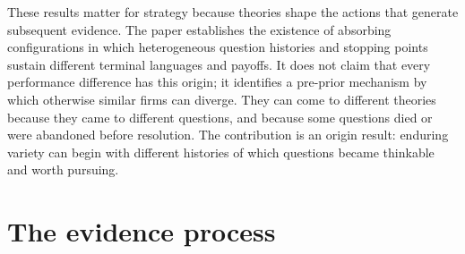 \documentclass[11pt]{article}
\theoremstyle{definition}
\begin{document}
These results matter for strategy because theories shape the actions that generate subsequent evidence.
The paper establishes the existence of absorbing configurations in which heterogeneous question histories and stopping points sustain different terminal languages and payoffs.
It does not claim that every performance difference has this origin; it identifies a pre-prior mechanism by which otherwise similar firms can diverge.
They can come to different theories because they came to different questions, and because some questions died or were abandoned before resolution.
The contribution is an origin result: enduring variety can begin with different histories of which questions became thinkable and worth pursuing.




\appendix
\section{The evidence process}
\label{app:eprocess}
\end{document}
